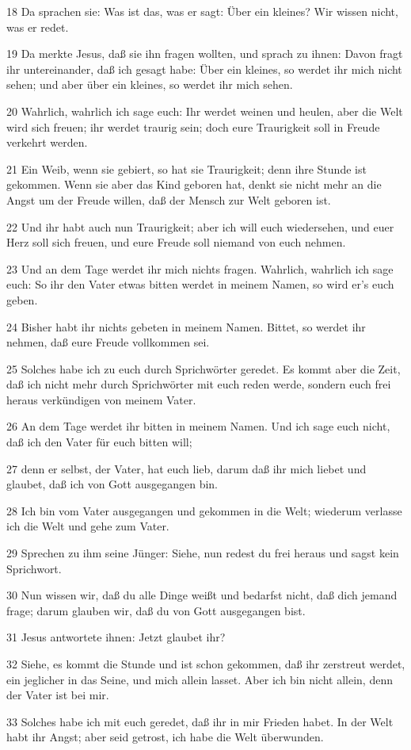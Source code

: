 \par 18 Da sprachen sie: Was ist das, was er sagt: Über ein kleines? Wir wissen nicht, was er redet.
\par 19 Da merkte Jesus, daß sie ihn fragen wollten, und sprach zu ihnen: Davon fragt ihr untereinander, daß ich gesagt habe: Über ein kleines, so werdet ihr mich nicht sehen; und aber über ein kleines, so werdet ihr mich sehen.
\par 20 Wahrlich, wahrlich ich sage euch: Ihr werdet weinen und heulen, aber die Welt wird sich freuen; ihr werdet traurig sein; doch eure Traurigkeit soll in Freude verkehrt werden.
\par 21 Ein Weib, wenn sie gebiert, so hat sie Traurigkeit; denn ihre Stunde ist gekommen. Wenn sie aber das Kind geboren hat, denkt sie nicht mehr an die Angst um der Freude willen, daß der Mensch zur Welt geboren ist.
\par 22 Und ihr habt auch nun Traurigkeit; aber ich will euch wiedersehen, und euer Herz soll sich freuen, und eure Freude soll niemand von euch nehmen.
\par 23 Und an dem Tage werdet ihr mich nichts fragen. Wahrlich, wahrlich ich sage euch: So ihr den Vater etwas bitten werdet in meinem Namen, so wird er's euch geben.
\par 24 Bisher habt ihr nichts gebeten in meinem Namen. Bittet, so werdet ihr nehmen, daß eure Freude vollkommen sei.
\par 25 Solches habe ich zu euch durch Sprichwörter geredet. Es kommt aber die Zeit, daß ich nicht mehr durch Sprichwörter mit euch reden werde, sondern euch frei heraus verkündigen von meinem Vater.
\par 26 An dem Tage werdet ihr bitten in meinem Namen. Und ich sage euch nicht, daß ich den Vater für euch bitten will;
\par 27 denn er selbst, der Vater, hat euch lieb, darum daß ihr mich liebet und glaubet, daß ich von Gott ausgegangen bin.
\par 28 Ich bin vom Vater ausgegangen und gekommen in die Welt; wiederum verlasse ich die Welt und gehe zum Vater.
\par 29 Sprechen zu ihm seine Jünger: Siehe, nun redest du frei heraus und sagst kein Sprichwort.
\par 30 Nun wissen wir, daß du alle Dinge weißt und bedarfst nicht, daß dich jemand frage; darum glauben wir, daß du von Gott ausgegangen bist.
\par 31 Jesus antwortete ihnen: Jetzt glaubet ihr?
\par 32 Siehe, es kommt die Stunde und ist schon gekommen, daß ihr zerstreut werdet, ein jeglicher in das Seine, und mich allein lasset. Aber ich bin nicht allein, denn der Vater ist bei mir.
\par 33 Solches habe ich mit euch geredet, daß ihr in mir Frieden habet. In der Welt habt ihr Angst; aber seid getrost, ich habe die Welt überwunden.

